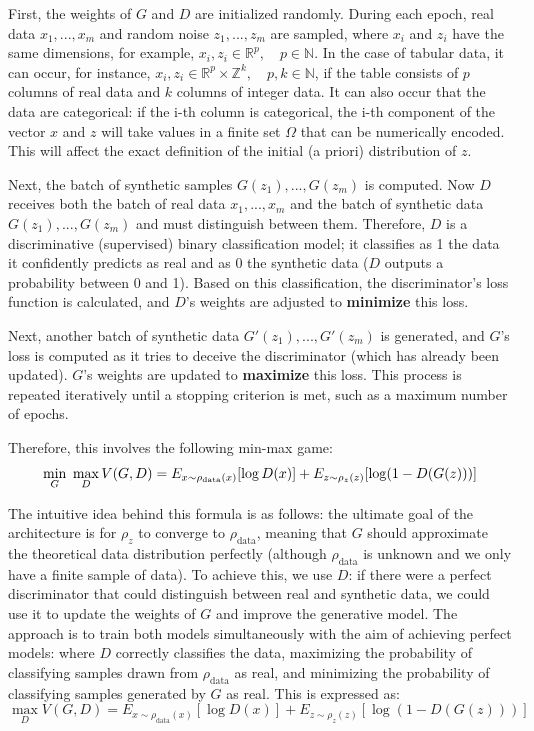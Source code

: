 First, the weights of $G$ and $D$ are initialized randomly. During each epoch, real data ${x_1,...,x_m}$ and random noise ${z_1,...,z_m}$ are sampled, where $x_i$ and $z_i$ have the same dimensions, for example, $x_i, z_i \in \mathbb{R}^p, \quad p \in \mathbb{N}$. In the case of tabular data, it can occur, for instance, $x_i, z_i \in \mathbb{R}^p \times \mathbb{Z}^k, \quad p,k \in \mathbb{N}$, if the table consists of $p$ columns of real data and $k$ columns of integer data. It can also occur that the data are categorical: if the i-th column is categorical, the i-th component of the vector $x$ and $z$ will take values in a finite set $\Omega$ that can be numerically encoded. This will affect the exact definition of the initial (a priori) distribution of $z$.

Next, the batch of synthetic samples ${G(z_1),...,G(z_m)}$ is computed. Now $D$ receives both the batch of real data ${x_1,...,x_m}$ and the batch of synthetic data ${G(z_1),...,G(z_m)}$ and must distinguish between them. Therefore, $D$ is a discriminative (supervised) binary classification model; it classifies as 1 the data it confidently predicts as real and as 0 the synthetic data ($D$ outputs a probability between 0 and 1). Based on this classification, the discriminator's loss function is calculated, and $D$'s weights are adjusted to \textbf{minimize} this loss.

Next, another batch of synthetic data ${G'(z_1),...,G'(z_m)}$ is generated, and $G$'s loss is computed as it tries to deceive the discriminator (which has already been updated). $G$'s weights are updated to \textbf{maximize} this loss. This process is repeated iteratively until a stopping criterion is met, such as a maximum number of epochs.

Therefore, this involves the following min-max game:
\begin{equation}
\min_G \hspace{0.3 em} \max_D V(G,D) = E_{x \sim \rho_{\text{data}}(x)}[\log D(x)] + E_{z \sim \rho_z(z)}[\log(1 - D(G(z)))]
\label{eq:funcion_objetivo_GAN}
\end{equation}

The intuitive idea behind this formula is as follows: the ultimate goal of the architecture is for $\rho_z$ to converge to $\rho_{\text{data}}$, meaning that $G$ should approximate the theoretical data distribution perfectly (although $\rho_{\text{data}}$ is unknown and we only have a finite sample of data). To achieve this, we use $D$: if there were a perfect discriminator that could distinguish between real and synthetic data, we could use it to update the weights of $G$ and improve the generative model. The approach is to train both models simultaneously with the aim of achieving perfect models: where $D$ correctly classifies the data, maximizing the probability of classifying samples drawn from $\rho_{\text{data}}$ as real, and minimizing the probability of classifying samples generated by $G$ as real. This is expressed as:
\begin{equation*}
\max_D V(G,D) = E_{x \sim \rho_{\text{data}}(x)}[\log D(x)] + E_{z \sim \rho_z(z)}[\log(1 - D(G(z)))]
\end{equation*}


